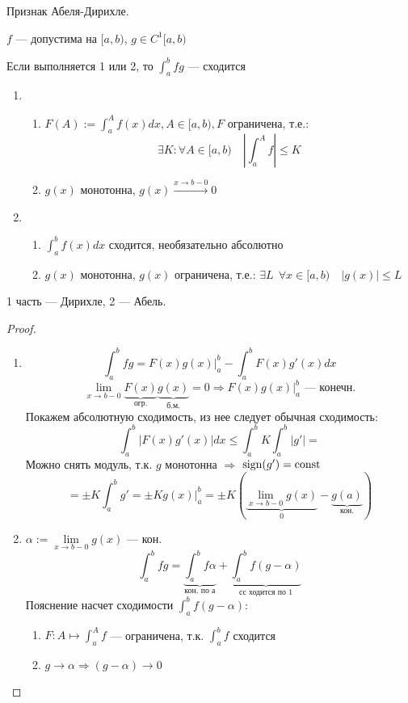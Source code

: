 \begin{theorem}
    Признак Абеля-Дирихле.

    $f$ --- допустима на $[a, b)$, $g\in C^1 [a, b)$

    Если выполняется 1 или 2, то $\int_a^b fg$ --- сходится
    \begin{enumerate}
        \item \begin{enumerate}
            \item $F(A) := \int_a^A f(x)dx , A\in [a, b), F$ ограничена, т.е.:
            $$\exists K : \forall A\in [a, b) \quad \left|\int_a^A f\right|\le K$$
            \item $g(x)$ монотонна, $g(x)\xrightarrow{x\to b-0} 0$
        \end{enumerate}
        \item \begin{enumerate}
            \item $\int_a^b f(x)dx$ сходится, необязательно абсолютно
            \item $g(x)$ монотонна, $g(x)$ ограничена, т.е.: $\exists L \ \ \forall x \in [a, b) \quad |g(x)| \le L$
        \end{enumerate}
    \end{enumerate}
    1 часть --- Дирихле, 2 --- Абель.
\end{theorem}
\begin{proof}
    \begin{enumerate}
        \item $$\int_a^b fg = F(x)g(x)\Big|_a^b - \int_a^b F(x)g'(x)dx$$
        $$\lim_{x\to b - 0} \underbrace{F(x)}_{\text{огр.}}\underbrace{g(x)}_{\text{б.м.}}=0 \Rightarrow F(x)g(x)\Big|_a^b \text{ --- конечн.}$$
        Покажем абсолютную сходимость, из нее следует обычная сходимость:
        $$\int_a^b |F(x)g'(x)|dx \le \int_a^b K\int_a^b |g'|=$$
        Можно снять модуль, т.к. $g$ монотонна $\Rightarrow$ $\operatorname{\text{sign}}(g')=\text{const}$
        $$=\pm K \int_a^b g'=\pm K g(x)\Big|_a^b=\pm K(\underbrace{\lim_{x\to b - 0}g(x)}_{0} - \underbrace{g(a)}_{\text{кон.}})$$
        \item $\alpha:=\lim\limits_{x\to b-0} g(x)$ --- кон.
        $$\int_a^b fg = \underbrace{\int_a^b f\alpha}_{\text{кон. по а}} + \underbrace{\int_a^b f(g-\alpha)}_{\text{сс ходится по 1}}$$
        Пояснение насчет сходимости $\int_a^b f(g-\alpha)$:
        \begin{enumerate}
            \item $F : A \mapsto \int_a^A f$ --- ограничена, т.к. $\int_a^b f$ сходится
            \item $g\to\alpha \Rightarrow (g-\alpha)\to0$ 
        \end{enumerate}
    \end{enumerate}
\end{proof}

